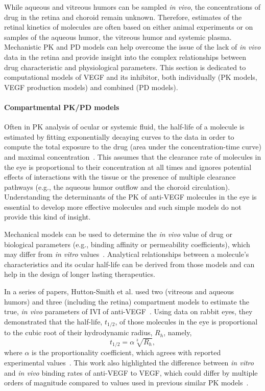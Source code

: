 \documentclass{article}
\begin{document}
While aqueous and vitreous humors can be sampled \textit{in vivo}, the concentrations of drug in the retina and choroid remain unknown. 
Therefore, estimates of the retinal kinetics of molecules are often based on either animal experiments or on samples of the aqueous humor, the vitreous humor and systemic plasma.
Mechanistic PK and PD models can help overcome the issue of the lack of \textit{in vivo} data in the retina and provide insight into the complex relationships between drug characteristic and physiological parameters.
This section is dedicated to computational models of VEGF and its inhibitor, both individually (PK models, VEGF production models) and combined (PD models).

\paragraph*{Compartmental PK/PD models}

Often in PK analysis of ocular or systemic fluid, the half-life of a molecule is estimated by fitting exponentially decaying curves to the data in order to compute the total exposure to the drug (area under the concentration-time curve) and maximal concentration~\cite{Bakri_2007, Kaiser_2019, Park_2015, Park_2016, Xu_2013}.
This assumes that the clearance rate of molecules in the eye is proportional to their concentration at all times and ignores potential effects of interactions with the tissue or the presence of multiple clearance pathways (e.g., the aqueous humor outflow and the choroid circulation).
Understanding the determinants of the PK of anti-VEGF molecules in the eye is essential to develop more effective molecules and such simple models do not provide this kind of insight.

Mechanical models can be used to determine the \textit{in vivo} value of drug or biological parameters (e.g., binding affinity or permeability coefficients), which may differ from \textit{in vitro} values~\cite{HuttonSmith_2016}.
Analytical relationships between a molecule's characteristics and its ocular half-life can be derived from those models and can help in the design of longer lasting therapeutics.

In a series of papers, Hutton-Smith et al. used two (vitreous and aqueous humors) and three (including the retina) compartment models to estimate the true, \textit{in vivo} parameters of IVI of anti-VEGF~\cite{HuttonSmith_2016,HuttonSmith_2017,HuttonSmith_2018}.
Using data on rabbit eyes, they demonstrated that the half-life, $t_{1/2}$, of those molecules in the eye is proportional to the cubic root of their hydrodynamic radius, $R_h$, namely,
\begin{equation}
  \label{eq:t12_Hutton-Smith}
  t_{1/2} = \alpha\sqrt[3]{R_h},
\end{equation}
where $\alpha$ is the proportionality coefficient, which agrees with reported experimental values~\cite{HuttonSmith_2016}.
This work also highlighted the difference between \textit{in vitro} and \textit{in vivo} binding rates of anti-VEGF to VEGF, which could differ by multiple orders of magnitude compared to values used in previous similar PK models~\cite{Saunders_2015}.
\end{document}
